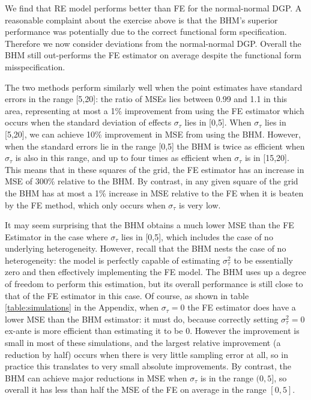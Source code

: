 \documentclass[12pt]{article}
\begin{document}
We find that RE model performs better than FE for the normal-normal DGP. A reasonable complaint about the exercise above is that the BHM's superior performance was potentially due to the correct functional form specification. Therefore we now consider deviations from the  normal-normal DGP. Overall the BHM still out-performs the FE estimator on average despite the functional form misspecification.

The two methods perform similarly well when the point estimates have standard errors in the range [5,20]: the ratio of MSEs lies between 0.99 and 1.1 in this area, representing at most a 1\% improvement from using the FE estimator which occurs when the standard deviation of effects $\sigma_{\tau}$ lies in [0,5]. When $\sigma_{\tau}$ lies in [5,20], we can achieve 10\% improvement in MSE from using the BHM. However, when the standard errors lie in the range [0,5] the BHM is twice as efficient when $\sigma_{\tau}$ is also in this range, and up to four times as efficient when $\sigma_{\tau}$ is in [15,20]. This means that in these squares of the grid, the FE estimator has an increase in MSE of 300\% relative to the BHM. By contrast, in any given square of the grid the BHM has at most a 1\% increase in MSE relative to the FE when it is beaten by the FE method, which only occurs when $\sigma_{\tau}$ is very low.

It may seem surprising that the BHM obtains a much lower MSE than the FE Estimator in the case where $\sigma_{\tau}$ lies in [0,5], which includes the case of no underlying heterogeneity. However, recall that the BHM nests the case of no heterogeneity: the model is perfectly capable of estimating $\sigma^2_{\tau}$ to be essentially zero and then effectively implementing the FE model. The BHM uses up a degree of freedom to perform this estimation, but its overall performance is still close to that of the FE estimator in this case. Of course, as shown in table \ref{table:simulations} in the Appendix, when $\sigma_{\tau} = 0$ the FE estimator does have a lower MSE than the BHM estimator: it must do, because correctly setting $\sigma^2_{\tau} = 0$ ex-ante is more efficient than estimating it to be 0. However the improvement is small in most of these simulations, and the largest relative improvement (a reduction by half) occurs when there is very little sampling error at all, so in practice this translates to very small absolute improvements. By contrast, the BHM can achieve major reductions in MSE when $\sigma_{\tau}$ is in the range $(0,5]$, so overall it has less than half the MSE of the FE on average in the range $[0,5]$.
\end{document}
